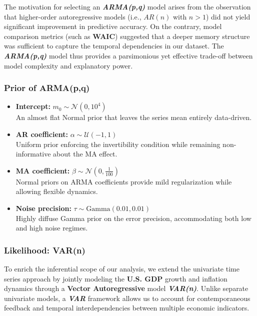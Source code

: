 \documentclass{Configuration_Files/PoliMi3i_thesis}
\begin{document}
The motivation for selecting an \textbf{\textit{ARMA(p,q)}} model arises from the observation that higher-order autoregressive models (i.e., $AR(n)$ with $n > 1$) did not yield significant improvement in predictive accuracy. On the contrary, model comparison metrics (such as \textbf{WAIC}) suggested that a deeper memory structure was sufficient to capture the temporal dependencies in our dataset. The \textbf{\textit{ARMA(p,q)}} model thus provides a parsimonious yet effective trade-off between model complexity and explanatory power.
\subsubsection{Prior of ARMA(p,q)}
\begin{itemize}
    \item \textbf{Intercept:} $m_0 \sim \mathcal{N}(0,10^4)$\\
    An almost flat Normal prior that leaves the series mean entirely data-driven.
    \item \textbf{AR coefficient:}  
    $\alpha \sim \mathcal{U}(-1,1)$\\
    Uniform prior enforcing the invertibility condition while remaining non-informative about the MA effect.
    \item \textbf{MA coefficient:}  
     $\beta \sim \mathcal{N}\left(0, \frac{1}{100} \right)$\\
    Normal priors on ARMA coefficients provide mild regularization while allowing flexible dynamics.
    \item \textbf{Noise precision:}  
    $\tau \sim \mathrm{Gamma}(0.01,0.01)$\\
    Highly diffuse Gamma prior on the error precision, accommodating both low and high noise regimes.
    
\end{itemize}
\subsubsection{Likelihood: VAR(n)}
To enrich the inferential scope of our analysis, we extend the univariate time series approach by jointly modeling the \textbf{U.S. GDP} growth and inflation dynamics through a \textbf{Vector Autoregressive} model \textbf{\textit{VAR(n)}}. Unlike separate univariate models, a \textbf{\textit{VAR}} framework allows us to account for contemporaneous feedback and temporal interdependencies between multiple economic indicators.
\end{document}
